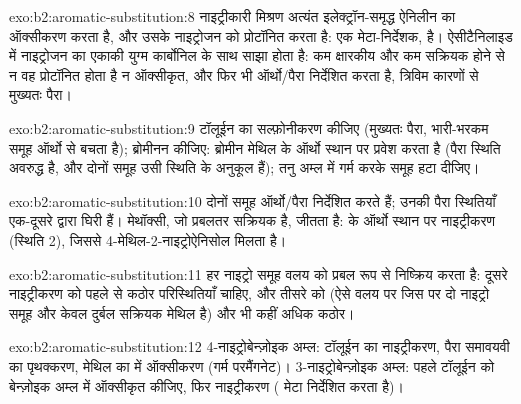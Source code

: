 \begin{solution}{exo:b2:aromatic-substitution:8}
नाइट्रीकारी मिश्रण अत्यंत इलेक्ट्रॉन-समृद्ध ऐनिलीन का ऑक्सीकरण करता है, और उसके नाइट्रोजन को प्रोटॉनित करता है:
 एक मेटा-निर्देशक,  है। ऐसीटैनिलाइड में नाइट्रोजन का एकाकी युग्म
कार्बोनिल के साथ साझा होता है: कम क्षारकीय और कम सक्रियक होने से न वह प्रोटॉनित होता है न ऑक्सीकृत,
और फिर भी ऑर्थो/पैरा निर्देशित करता है, त्रिविम कारणों से मुख्यतः पैरा।
\end{solution}

\begin{solution}{exo:b2:aromatic-substitution:9}
टॉलूईन का सल्फ़ोनीकरण कीजिए (मुख्यतः पैरा, भारी-भरकम समूह ऑर्थो से बचता है); ब्रोमीनन कीजिए: ब्रोमीन
मेथिल के ऑर्थो स्थान पर प्रवेश करता है (पैरा स्थिति अवरुद्ध है, और दोनों समूह उसी स्थिति के अनुकूल हैं);
तनु अम्ल में गर्म करके  समूह हटा दीजिए।
\end{solution}

\begin{solution}{exo:b2:aromatic-substitution:10}
दोनों समूह ऑर्थो/पैरा निर्देशित करते हैं; उनकी पैरा स्थितियाँ एक-दूसरे द्वारा घिरी हैं। मेथॉक्सी,
जो प्रबलतर सक्रियक है, जीतता है:  के ऑर्थो स्थान पर नाइट्रीकरण (स्थिति 2), जिससे
4-मेथिल-2-नाइट्रोऐनिसोल मिलता है।
\end{solution}

\begin{solution}{exo:b2:aromatic-substitution:11}
हर नाइट्रो समूह वलय को प्रबल रूप से निष्क्रिय करता है: दूसरे नाइट्रीकरण को पहले से कठोर परिस्थितियाँ
चाहिए, और तीसरे को (ऐसे वलय पर जिस पर दो नाइट्रो समूह और केवल दुर्बल सक्रियक
मेथिल है) और भी कहीं अधिक कठोर।
\end{solution}

\begin{solution}{exo:b2:aromatic-substitution:12}
4-नाइट्रोबेन्ज़ोइक अम्ल: टॉलूईन का नाइट्रीकरण, पैरा समावयवी का पृथक्करण, मेथिल का
 में ऑक्सीकरण (गर्म परमैंगनेट)। 3-नाइट्रोबेन्ज़ोइक अम्ल: पहले टॉलूईन को बेन्ज़ोइक अम्ल में ऑक्सीकृत कीजिए, फिर
नाइट्रीकरण ( मेटा निर्देशित करता है)।
\end{solution}

